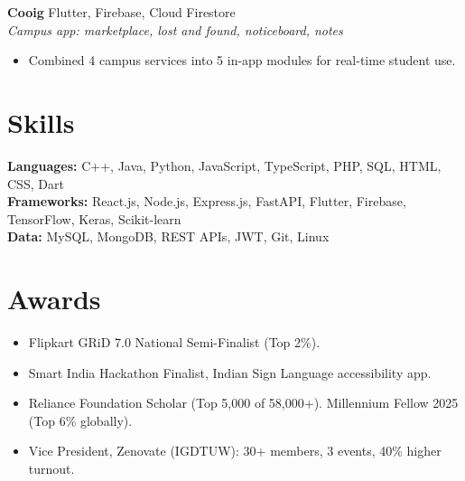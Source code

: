 \documentclass[a4paper,10pt]{article}
\newcommand{\entry}[4]{%
  \vspace{3pt}%
  \noindent\textbf{#1} \hfill #2\\[0.4pt]
  \textit{#3} \hfill \textit{#4}\par
  \vspace{1pt}%
}
\begin{document}
\entry{Cooig}{Flutter, Firebase, Cloud Firestore}
{Campus app: marketplace, lost and found, noticeboard, notes}{}
\begin{itemize}
  \item Combined 4 campus services into 5 in-app modules for real-time student use.
\end{itemize}

\section{Skills}
\noindent\textbf{Languages:} C++, Java, Python, JavaScript, TypeScript, PHP, SQL, HTML, CSS, Dart\\[2pt]
\textbf{Frameworks:} React.js, Node.js, Express.js, FastAPI, Flutter, Firebase, TensorFlow, Keras, Scikit-learn\\[2pt]
\textbf{Data:} MySQL, MongoDB, REST APIs, JWT, Git, Linux

\section{Awards}
\begin{itemize}
  \item Flipkart GRiD 7.0 National Semi-Finalist (Top 2\%).
  \item Smart India Hackathon Finalist, Indian Sign Language accessibility app.
  \item Reliance Foundation Scholar (Top 5,000 of 58,000+). Millennium Fellow 2025 (Top 6\% globally).
  \item Vice President, Zenovate (IGDTUW): 30+ members, 3 events, 40\% higher turnout.
\end{itemize}
\end{document}
